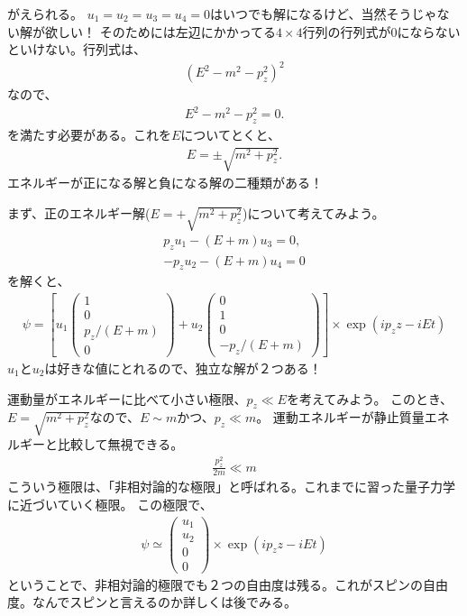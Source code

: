 \documentclass[10pt,a4paper]{jarticle}
\begin{document}
がえられる。
%
$u_1 = u_2 = u_3 = u_4 = 0$はいつでも解になるけど、当然そうじゃない解が欲しい！
そのためには左辺にかかってる$4 \times 4$行列の行列式が$0$にならないといけない。行列式は、
\begin{align}
(E^2-m^2-p_z^2)^2
\end{align}
なので、
\begin{align}
E^2-m^2-p_z^2 = 0.
\end{align}
を満たす必要がある。これを$E$についてとくと、
\begin{align}
E = \pm \sqrt{m^2 + p_z^2}.
\end{align}
エネルギーが正になる解と負になる解の二種類がある！

まず、正のエネルギー解($E = + \sqrt{m^2+p_z^2}$)について考えてみよう。
\begin{align}
p_z u_1 - (E+m) u_3 = 0, \\
-p_z u_2 - (E+m) u_4 = 0
\end{align}
を解くと、
\begin{align}
\psi =
\left[ u_1 \left(\begin{array}{cc}
1 \\ 0 \\ p_z/(E+m) \\ 0
\end{array}\right)
+
u_2 \left(\begin{array}{cc}
0 \\ 1 \\ 0 \\ -p_z/(E+m)
\end{array}\right) \right] \times \exp(ip_z z - i Et) \label{eq:positive energy solution}
\end{align}
$u_1$と$u_2$は好きな値にとれるので、独立な解が２つある！

運動量がエネルギーに比べて小さい極限、$p_z \ll E$を考えてみよう。
このとき、$E = \sqrt{m^2 + p_z^2}$なので、$E \sim m$かつ、$p_z \ll m$。
運動エネルギーが静止質量エネルギーと比較して無視できる。
\begin{align}
\frac{p_z^2}{2m} \ll m
\end{align}
こういう極限は、「非相対論的な極限」と呼ばれる。これまでに習った量子力学に近づいていく極限。
この極限で、
\begin{align}
\psi \simeq
\left(\begin{array}{cc}
u_1 \\ u_2 \\ 0 \\ 0
\end{array}\right)
 \times \exp(ip_z z - i Et)
\end{align}
ということで、非相対論的極限でも２つの自由度は残る。これがスピンの自由度。なんでスピンと言えるのか詳しくは後でみる。
\end{document}

